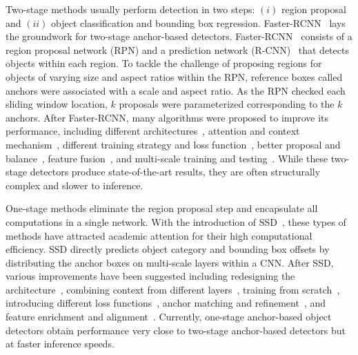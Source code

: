 \documentclass[journal]{IEEEtran}
\begin{document}
Two-stage methods usually perform detection in two steps: $(i)$ region proposal and $(ii)$ object classification and bounding box regression. Faster-RCNN~\cite{ren2015faster} lays the groundwork for two-stage anchor-based detectors. Faster-RCNN~\cite{ren2015faster} consists of a region proposal network (RPN) and a prediction network (R-CNN)~\cite{girshick2014rich, girshick2015fast} that detects objects within each region. To tackle the challenge of proposing regions for objects of varying size and aspect ratios within the RPN, reference boxes called anchors were associated with a scale and aspect ratio. As the RPN checked each sliding window location, $k$ proposals were parameterized corresponding to the $k$ anchors. After Faster-RCNN, many algorithms were proposed to improve its performance, including different architectures~\cite{cai2016unified, dai2016r, cai2018cascade, lee2019me}, attention and context mechanism~\cite{bell2016inside, shrivastava2016contextual, liu2018structure, chen2018context}, different training strategy and loss function~\cite{najibi2016g, shrivastava2016training, wang2017fast, he2019bounding}, better proposal and balance~\cite{tan2019learning, pang2019libra}, feature fusion~\cite{lin2017feature}, and multi-scale training and testing~\cite{singh2018analysis, najibi2019autofocus}. While these two-stage detectors produce state-of-the-art results, they are often structurally complex and slower to inference.

One-stage methods eliminate the region proposal step and encapsulate all computations in a single network. With the introduction of SSD~\cite{liu2016ssd}, these types of methods have attracted academic attention for their high computational efficiency. SSD directly predicts object category and bounding box offsets by distributing the anchor boxes on multi-scale layers within a CNN. After SSD, various improvements have been suggested including redesigning the architecture~\cite{kim2018parallel, kong2018deep}, combining context from different layers~\cite{kong2017ron, fu2017dssd}, training from scratch~\cite{shen2017dsod, zhu2019scratchdet}, introducing different loss functions~\cite{chen2019towards, lin2017focal}, anchor matching and refinement~\cite{zhang2018single, zhang2020bridging}, and feature enrichment and alignment~\cite{liu2018receptive, zhang2018single, wang2019learning}. Currently, one-stage anchor-based object detectors obtain performance very close to two-stage anchor-based detectors but at faster inference speeds.
\end{document}
